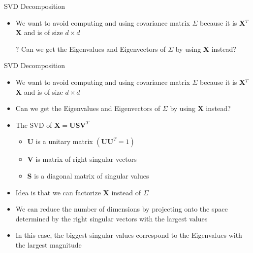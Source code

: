 \documentclass[aspectratio=169]{beamer}
\begin{document}
%
%
\begin{frame}{SVD Decomposition}

\begin{itemize}
	\item We want to avoid computing and using covariance matrix $\Sigma$  because it is \textbf{X}$^T$\textbf{X} and is of size $d \times d$
	\item[?] Can we get the Eigenvalues and Eigenvectors of $\Sigma$ by using \textbf{X} instead?
\end{itemize}
\end{frame}
\begin{frame}{SVD Decomposition}

\begin{itemize}
	\item We want to avoid computing and using covariance matrix $\Sigma$  because it is \textbf{X}$^T$\textbf{X} and is of size $d \times d$
	\item Can we get the Eigenvalues and Eigenvectors of $\Sigma$ by using \textbf{X} instead?
	\item The SVD of $\textbf{X} = \textbf{U} \textbf{S} \textbf{V}^T$
\begin{itemize}
	\item $\textbf{U}$ is a unitary matrix $(\textbf{UU}^T = 1)$
	\item $\textbf{V}$ is matrix of right singular vectors 
	\item \textbf{S} is a diagonal matrix of singular values
\end{itemize}
	\item Idea is that we can factorize $\textbf{X}$ instead of  \textbf{$\Sigma$}
	\item We can reduce the number of dimensions by projecting onto the space determined by the right singular vectors with the largest values 
	\item In this case, the biggest singular values correspond to the Eigenvalues with the largest magnitude %
\end{itemize}
\end{frame}
\end{document}
